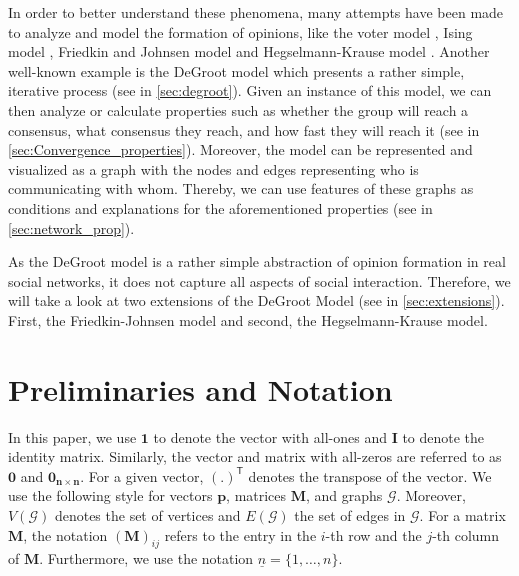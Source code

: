 \documentclass[journal,compsoc,10pt]{IEEEtran}
\newcommand{\gG}{\mathcal{G}}
\newcommand{\T}{\mathsf{T}}            %
\renewcommand{\vec}[1]{\bm{#1}}        %
\newcommand{\mat}[1]{\bm{#1}}          %
\newcommand{\ones}{\bm{1}}             %
\newcommand{\zeros}{\bm{0}}             %
\newcommand{\zerosmatr}{\bm{0_{n\times n}}}
\newcommand{\eye}{\bm{I}}              %
\begin{document}
In order to better understand these phenomena, many attempts have been made to analyze and model the formation of opinions, like the voter model \cite{Voter-model}, Ising model \cite{Ising-model}, Friedkin and Johnsen model \cite{Friedkin01011990} and Hegselmann-Krause model \cite{Hegselmann-Krause}. Another well-known example is the DeGroot model \cite{Degroot01031974} which presents a rather simple, iterative process (see in \cref{sec:degroot}).
Given an instance of this model, we can then analyze or calculate properties such as whether the group will reach a consensus, what consensus they reach, and how fast they will reach it (see in \cref{sec:Convergence_properties}). Moreover, the model can be represented and visualized as a graph with the nodes and edges representing who is communicating with whom. Thereby, we can use features of these graphs as conditions and explanations for the aforementioned properties (see in \cref{sec:network_prop}).

As the DeGroot model is a rather simple abstraction of opinion formation in real social networks, it does not capture all aspects of social interaction. Therefore, we will take a look at two extensions of the DeGroot Model (see in \cref{sec:extensions}). First, the Friedkin-Johnsen model and second, the Hegselmann-Krause model.

\section{Preliminaries and Notation}\label{sec:prelim_notation}
In this paper, we use $\ones$ to denote the vector with all-ones and $\eye$ to denote the identity matrix. Similarly, the vector and matrix with all-zeros are referred to as $\zeros$ and $\zerosmatr$. For a given vector, $(.)^\T$ denotes the transpose of the vector. We use the following style for vectors $\vec p$, matrices $\mat M$, and graphs $\gG$. Moreover, $V(\gG)$ denotes the set of vertices and $E(\gG)$ the set of edges in $\gG$. For a matrix $\mat M$, the notation $(\mat M)_{ij}$ refers to the entry in the $i$-th row and the $j$-th column of $\mat M$. Furthermore, we use the notation $\underline{n} = \{1,\dots,n\}$. 
\end{document}
